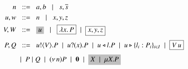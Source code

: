 	\begin{figure}[t]
		\begin{align*}
			n  & \bnfis a,b \bnfbar s, \dual{s} 
			\\
			u,w  & \bnfis n \bnfbar x,y,z 
			\\
			V,W  & \bnfis \nonhosyntax{u} \bnfbar \nonpisyntax{\abs{x}{P}} \sbnfbar \nonpisyntax{x,y,z}
			\\[1mm]
			P,Q
			 & \bnfis 
			\bout{u}{V}{P}  \sbnfbar  \binp{u}{x}{P} \sbnfbar
			\bsel{u}{l} P \sbnfbar \bbra{u}{l_i:P_i}_{i \in I} \sbnfbar \nonpisyntax{\appl{V}{u}} 
			\\[1mm]
			 & \sbnfbar P\Par Q \sbnfbar \news{n} P 
			\sbnfbar \inact \sbnfbar \nonhosyntax{\rvar{X} \sbnfbar \recp{X}{P}}
		\end{align*}
	\caption{}
	\label{fig:syntax}
\end{figure}


